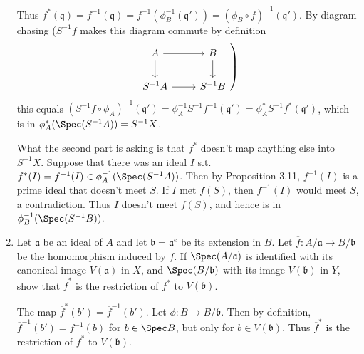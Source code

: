 \documentclass[a4paper]{exam}
\begin{document}
\begin{questions}
\begin{enumerate}
\begin{solution}
	Thus $f^\ast(\mathfrak{q}) = f^{-1}(\mathfrak{q}) = f^{-1}(\phi _B^{-1}(\mathfrak{q}')) = (\phi_B \circ f)^{-1}(\mathfrak{q}') $.
	By diagram chasing ($S^{-1} f$ makes this diagram commute by definition
	\[
	\left.
		\begin{tikzcd}
			A & B\\
			S^{-1}A & S^{-1}B
			\arrow[from=1-1,to=1-2]
			\arrow[from=1-1,to=2-1]
			\arrow[from=2-1,to=2-2]
			\arrow[from=1-2,to=2-2]
		\end{tikzcd}
	\right)\]
	this equals $(S^{-1}f\circ \phi_A)^{-1}(\mathfrak{q}') = \phi_A^{-1} S^{-1}f^{-1}(\mathfrak{q}') = \phi_A^\ast S^{-1}f^\ast(\mathfrak{q}')$, which is in $\phi_A^\ast(\Spec(S^{-1}A)) = S^{-1}X$.

	What the second part is asking is that $f^\ast $ doesn't map anything else into $S^{-1}X $.
	Suppose that there was an ideal $I $ s.t. $f^\ast(I) = f^{-1}(I) \in \phi_A^{-1}(\Spec(S^{-1}A))$.
	Then by Proposition 3.11, $f^{-1}(I) $ is a prime ideal that doesn't meet $S $.
	If $I $ met $f(S) $, then $f^{-1}(I) $ would meet $S $, a contradiction.
	Thus $I $ doesn't meet $f(S) $, and hence is in $\phi_B^{-1}(\Spec(S^{-1}B)) $.
\end{solution}

\item Let $\mathfrak{a} $ be an ideal of $A $ and let $\mathfrak{b} = \mathfrak{a}^e $ be its extension in $B $.
	Let $\overline{f}:A / \mathfrak{a} \to B / \mathfrak{b}  $ be the homomorphism induced by $f $.
	If $\Spec(A / \mathfrak{a}) $ is identified with its canonical image $V(\mathfrak{a}) $ in $X $, and $\Spec(B / \mathfrak{b}) $ with its image $V(\mathfrak{b}) $ in $Y $, show that $\overline{f}^\ast  $ is the restriction of $f^\ast $ to $V(\mathfrak{b}) $.
\begin{solution}
	The map $\overline{f}^\ast(b') = \overline{f}^{-1}(b')$.
	Let $\phi : B \to B / \mathfrak{b} $.
	Then by definition, $\overline{f}^{-1}(b') = f^{-1}(b)  $ for $b \in \Spec B $, but only for $b \in V(\mathfrak{b})$.
	Thus $\overline{f}^\ast  $ is the restriction of $f^\ast $ to $V(\mathfrak{b}) $.
\end{solution}


\end{enumerate}
\end{questions}
\end{document}
